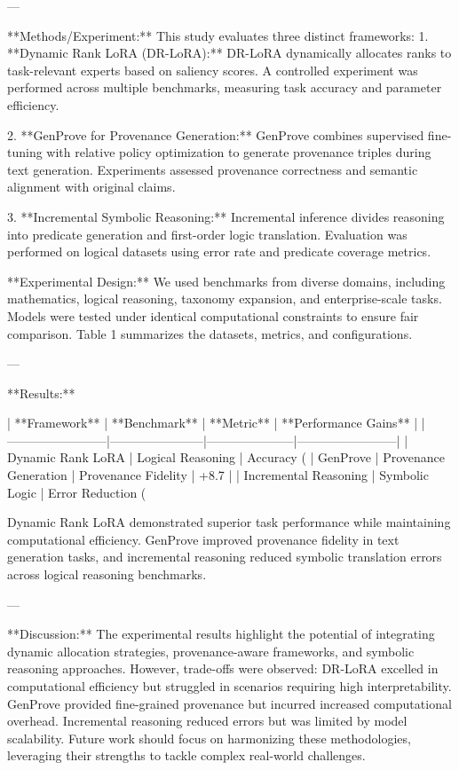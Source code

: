 ---

**Methods/Experiment:**  
This study evaluates three distinct frameworks:  
1. **Dynamic Rank LoRA (DR-LoRA):**  
   DR-LoRA dynamically allocates ranks to task-relevant experts based on saliency scores. A controlled experiment was performed across multiple benchmarks, measuring task accuracy and parameter efficiency.

2. **GenProve for Provenance Generation:**  
   GenProve combines supervised fine-tuning with relative policy optimization to generate provenance triples during text generation. Experiments assessed provenance correctness and semantic alignment with original claims.

3. **Incremental Symbolic Reasoning:**  
   Incremental inference divides reasoning into predicate generation and first-order logic translation. Evaluation was performed on logical datasets using error rate and predicate coverage metrics.

**Experimental Design:**  
We used benchmarks from diverse domains, including mathematics, logical reasoning, taxonomy expansion, and enterprise-scale tasks. Models were tested under identical computational constraints to ensure fair comparison. Table 1 summarizes the datasets, metrics, and configurations.

---

**Results:**  

| **Framework**         | **Benchmark**         | **Metric**          | **Performance Gains** |
|------------------------|-----------------------|---------------------|------------------------|
| Dynamic Rank LoRA      | Logical Reasoning     | Accuracy (%
| GenProve               | Provenance Generation | Provenance Fidelity | +8.7                  |
| Incremental Reasoning  | Symbolic Logic        | Error Reduction (%

Dynamic Rank LoRA demonstrated superior task performance while maintaining computational efficiency. GenProve improved provenance fidelity in text generation tasks, and incremental reasoning reduced symbolic translation errors across logical reasoning benchmarks.

---

**Discussion:**  
The experimental results highlight the potential of integrating dynamic allocation strategies, provenance-aware frameworks, and symbolic reasoning approaches. However, trade-offs were observed: DR-LoRA excelled in computational efficiency but struggled in scenarios requiring high interpretability. GenProve provided fine-grained provenance but incurred increased computational overhead. Incremental reasoning reduced errors but was limited by model scalability. Future work should focus on harmonizing these methodologies, leveraging their strengths to tackle complex real-world challenges.

